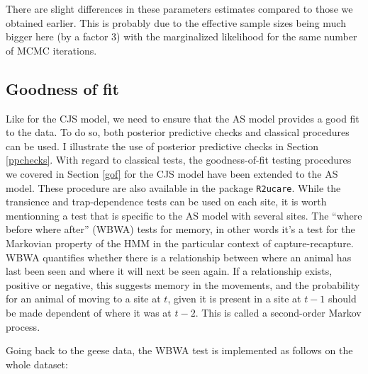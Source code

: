 \documentclass[
  12pt,
]{krantz}
\newenvironment{Shaded}{\begin{snugshade}}{\end{snugshade}}
\newcommand{\DecValTok}[1]{\textcolor[rgb]{0.00,0.00,0.81}{#1}}
\newcommand{\DocumentationTok}[1]{\textcolor[rgb]{0.56,0.35,0.01}{\textbf{\textit{#1}}}}
\newcommand{\FunctionTok}[1]{\textcolor[rgb]{0.13,0.29,0.53}{\textbf{#1}}}
\newcommand{\NormalTok}[1]{#1}
\newcommand{\OtherTok}[1]{\textcolor[rgb]{0.56,0.35,0.01}{#1}}
\newcommand{\SpecialCharTok}[1]{\textcolor[rgb]{0.81,0.36,0.00}{\textbf{#1}}}
\newcommand{\StringTok}[1]{\textcolor[rgb]{0.31,0.60,0.02}{#1}}
\begin{document}
There are slight differences in these parameters estimates compared to those we obtained earlier. This is probably due to the effective sample sizes being much bigger here (by a factor 3) with the marginalized likelihood for the same number of MCMC iterations.

\subsection{Goodness of fit}\label{gofas}

Like for the CJS model, we need to ensure that the AS model provides a good fit to the data. To do so, both posterior predictive checks and classical procedures can be used. I illustrate the use of posterior predictive checks in Section \ref{ppchecks}. With regard to classical tests, the goodness-of-fit testing procedures we covered in Section \ref{gof} for the CJS model have been extended to the AS model. These procedure are also available in the package \texttt{R2ucare}. While the transience and trap-dependence tests can be used on each site, it is worth mentionning a test that is specific to the AS model with several sites. The ``where before where after'' (WBWA) tests for memory, in other words it's a test for the Markovian property of the HMM in the particular context of capture-recapture. WBWA quantifies whether there is a relationship between where an animal has last been seen and where it will next be seen again. If a relationship exists, positive or negative, this suggests memory in the movements, and the probability for an animal of moving to a site at \(t\), given it is present in a site at \(t-1\) should be made dependent of where it was at \(t-2\). This is called a second-order Markov process.

Going back to the geese data, the WBWA test is implemented as follows on the whole dataset:

\begin{Shaded}
\end{Shaded}
\end{document}
